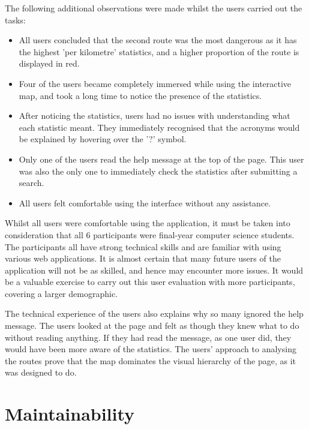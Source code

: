 \documentclass[authoryearcitations]{UoYCSproject}
\begin{document}
The following additional observations were made whilst the users carried out the tasks:

\begin{itemize}
	\item All users concluded that the second route was the most dangerous as it has the highest 'per kilometre' statistics, and a higher proportion of the route is displayed in red.
	\item Four of the users became completely immersed while using the interactive map, and took a long time to notice the presence of the statistics. 
	\item After noticing the statistics, users had no issues with understanding what each statistic meant. They immediately recognised that the acronyms would be explained by hovering over the '?' symbol.
	\item Only one of the users read the help message at the top of the page. This user was also the only one to immediately check the statistics after submitting a search.
	\item All users felt comfortable using the interface without any assistance.
\end{itemize}

Whilst all users were comfortable using the application, it must be taken into consideration that all 6 participants were final-year computer science students. The participants all have strong technical skills and are familiar with using various web applications. It is almost certain that many future users of the application will not be as skilled, and hence may encounter more issues. It would be a valuable exercise to carry out this user evaluation with more participants, covering a larger demographic.

The technical experience of the users also explains why so many ignored the help message. The users looked at the page and felt as though they knew what to do without reading anything. If they had read the message, as one user did, they would have been more aware of the statistics. The users' approach to analysing the routes prove that the map dominates the visual hierarchy of the page, as it was designed to do.

\section{Maintainability}
\end{document}
